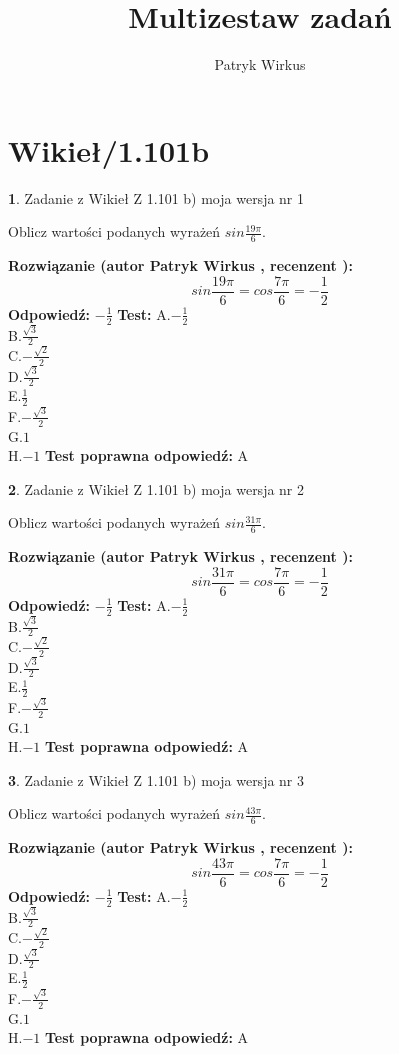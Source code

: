 \documentclass[12pt, a4paper]{article}
\title{Multizestaw zadań}
\author{Patryk Wirkus}
\date{}
\theoremstyle{definition} %
\newtheorem{zad}{}
\newcommand{\kategoria}[1]{\section{#1}}
\newcommand{\zadStart}[1]{\begin{zad}#1\newline}
\newcommand{\zadStop}{\end{zad}}
\newcommand{\rozwStart}[2]{\noindent \textbf{Rozwiązanie (autor #1 , recenzent #2): }\newline}
\newcommand{\rozwStop}{\newline}
\newcommand{\odpStart}{\noindent \textbf{Odpowiedź:}\newline}
\newcommand{\odpStop}{\newline}
\newcommand{\testStart}{\noindent \textbf{Test:}\newline}
\newcommand{\testStop}{\newline}
\newcommand{\kluczStart}{\noindent \textbf{Test poprawna odpowiedź:}\newline}
\newcommand{\kluczStop}{\newline}
\begin{document}
\maketitle

\kategoria{Wikieł/1.101b}


\zadStart{Zadanie z Wikieł Z 1.101 b) moja wersja nr 1}

Oblicz wartości podanych wyrażeń $sin \frac{19\pi}{6}$.
\zadStop
\rozwStart{Patryk Wirkus}{}
$$sin \frac{19\pi}{6} = cos \frac{7\pi}{6} = -\frac{1}{2}$$
\rozwStop
\odpStart
$-\frac{1}{2}$
\odpStop
\testStart
A.$-\frac{1}{2}$\\
B.$\frac{\sqrt{3}}{2}$\\
C.$-\frac{\sqrt{2}}{2}$\\
D.$\frac{\sqrt{3}}{2}$\\
E.$\frac{1}{2}$\\
F.$-\frac{\sqrt{3}}{2}$\\
G.$1$\\
H.$-1$
\testStop
\kluczStart
A
\kluczStop



\zadStart{Zadanie z Wikieł Z 1.101 b) moja wersja nr 2}

Oblicz wartości podanych wyrażeń $sin \frac{31\pi}{6}$.
\zadStop
\rozwStart{Patryk Wirkus}{}
$$sin \frac{31\pi}{6} = cos \frac{7\pi}{6} = -\frac{1}{2}$$
\rozwStop
\odpStart
$-\frac{1}{2}$
\odpStop
\testStart
A.$-\frac{1}{2}$\\
B.$\frac{\sqrt{3}}{2}$\\
C.$-\frac{\sqrt{2}}{2}$\\
D.$\frac{\sqrt{3}}{2}$\\
E.$\frac{1}{2}$\\
F.$-\frac{\sqrt{3}}{2}$\\
G.$1$\\
H.$-1$
\testStop
\kluczStart
A
\kluczStop



\zadStart{Zadanie z Wikieł Z 1.101 b) moja wersja nr 3}

Oblicz wartości podanych wyrażeń $sin \frac{43\pi}{6}$.
\zadStop
\rozwStart{Patryk Wirkus}{}
$$sin \frac{43\pi}{6} = cos \frac{7\pi}{6} = -\frac{1}{2}$$
\rozwStop
\odpStart
$-\frac{1}{2}$
\odpStop
\testStart
A.$-\frac{1}{2}$\\
B.$\frac{\sqrt{3}}{2}$\\
C.$-\frac{\sqrt{2}}{2}$\\
D.$\frac{\sqrt{3}}{2}$\\
E.$\frac{1}{2}$\\
F.$-\frac{\sqrt{3}}{2}$\\
G.$1$\\
H.$-1$
\testStop
\kluczStart
A
\kluczStop
\end{document}
